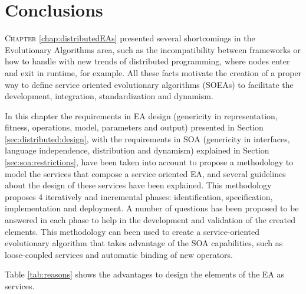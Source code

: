 \section{Conclusions}

\lettrine{C}{hapter} \ref{chap:distributedEAs} presented several shortcomings in the Evolutionary Algorithms area, such as the  incompatibility between frameworks or how to handle with new trends of distributed programming, where nodes enter and exit in runtime, for example. All these facts  motivate the creation of a proper way to define service oriented evolutionary algorithms (SOEAs) to facilitate the development, integration, standardization and dynamism.

In this chapter the requirements in EA design (genericity in representation, fitness, operations, model, parameters and output) presented  in Section \ref{sec:distributed:design}, with the requirements in SOA (genericity in interfaces, language independence, distribution and dynamism) explained in Section \ref{sec:soa:restrictions}, have been taken into account to propose a methodology to model the services that compose a service oriented EA, and several guidelines about the design of these services have been explained. This methodology proposes 4 iteratively and incremental phases: identification, specification, implementation and deployment. A number of questions has been proposed to be answered in each phase to help in the development and validation of the created elements. This methodology can been used to create a service-oriented evolutionary algorithm that takes advantage of the SOA capabilities, such as loose-coupled services and automatic binding of new operators. 



Table \ref{tab:reasons} shows the advantages to design the elements of the EA as services.


